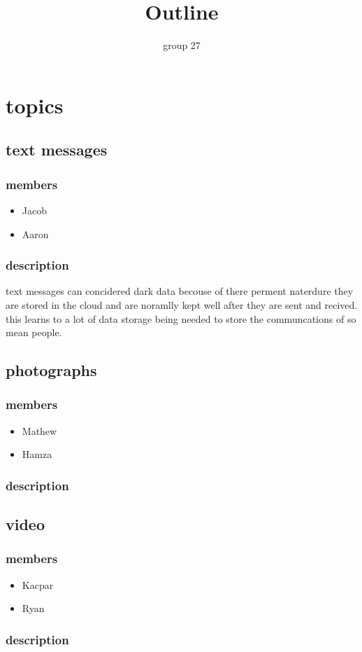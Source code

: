 \documentclass{article}
\begin{document}
\title{Outline}
\author{group 27}

\maketitle
\newpage


\section{topics}
\subsection{text messages} 
\subsubsection{members}
\begin{itemize}
    \item Jacob
    \item Aaron
\end{itemize}
\subsubsection{description}
 text messages can concidered dark data becouse of there perment naterdure they are stored in the cloud and 
 are noramlly kept well after they are sent and recived. this learns to a lot of data storage being needed to
 store the communcations of so mean people.

\subsection{photographs}
\subsubsection{members}
\begin{itemize}
    \item Mathew
    \item Hamza
\end{itemize}
\subsubsection{description}

\subsection{video}
\subsubsection{members}
\begin{itemize}
    \item Kacpar
    \item Ryan
\end{itemize}
\subsubsection{description}
\end{document}
